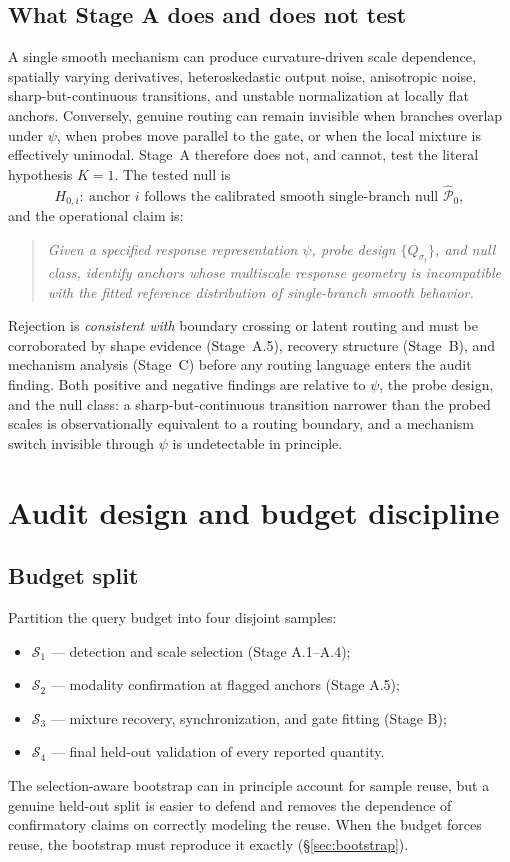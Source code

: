 \documentclass[11pt]{article}
\newcommand{\nullgen}{\widehat{\mathcal P}_0}
\begin{document}
\subsection{What Stage A does and does not test}
\label{sec:claim}

A single smooth mechanism can produce curvature-driven scale dependence, spatially varying
derivatives, heteroskedastic output noise, anisotropic noise, sharp-but-continuous
transitions, and unstable normalization at locally flat anchors. Conversely, genuine routing
can remain invisible when branches overlap under \(\psi\), when probes move parallel to the
gate, or when the local mixture is effectively unimodal. Stage~A therefore does not, and
cannot, test the literal hypothesis \(K=1\). The tested null is
\[
  H_{0,i}:\ \text{anchor \(i\) follows the calibrated smooth single-branch null } \nullgen ,
\]
and the operational claim is:
\begin{quote}
\emph{Given a specified response representation \(\psi\), probe design
\(\{Q_{\sigma_t}\}\), and null class, identify anchors whose multiscale response geometry is
incompatible with the fitted reference distribution of single-branch smooth behavior.}
\end{quote}
Rejection is \emph{consistent with} boundary crossing or latent routing and must be
corroborated by shape evidence (Stage~A.5), recovery structure (Stage~B), and mechanism
analysis (Stage~C) before any routing language enters the audit finding. Both positive and
negative findings are relative to \(\psi\), the probe design, and the null class: a
sharp-but-continuous transition narrower than the probed scales is observationally equivalent
to a routing boundary, and a mechanism switch invisible through \(\psi\) is undetectable in
principle.

\section{Audit design and budget discipline}
\label{sec:design}

\subsection{Budget split}
\label{sec:budget}

Partition the query budget into four disjoint samples:
\begin{itemize}[leftmargin=1.8em]
  \item \(\mathcal S_1\) --- detection and scale selection (Stage A.1--A.4);
  \item \(\mathcal S_2\) --- modality confirmation at flagged anchors (Stage A.5);
  \item \(\mathcal S_3\) --- mixture recovery, synchronization, and gate fitting (Stage B);
  \item \(\mathcal S_4\) --- final held-out validation of every reported quantity.
\end{itemize}
The selection-aware bootstrap can in principle account for sample reuse, but a genuine
held-out split is easier to defend and removes the dependence of confirmatory claims on
correctly modeling the reuse. When the budget forces reuse, the bootstrap must reproduce it
exactly (\S\ref{sec:bootstrap}).
\end{document}
